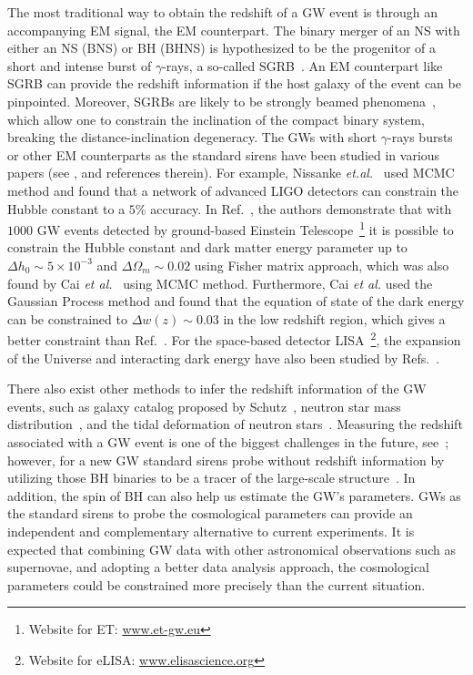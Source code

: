 \documentclass[a4paper,11pt]{article}
\begin{document}
The most traditional way to obtain the redshift of a  GW event is through an accompanying EM signal, the EM counterpart. The binary merger of an NS with either an NS (BNS) or BH (BHNS) is hypothesized to be the progenitor of a short and intense burst of $\gamma$-rays, a so-called SGRB~\cite{Nakar:2007yr}. An EM counterpart like SGRB can provide the redshift information if the host galaxy of the event can be pinpointed. Moreover, SGRBs are likely to be strongly beamed phenomena~\cite{Nakar:2005bs}, which allow one to constrain the inclination of the compact binary system, breaking the distance-inclination degeneracy. The GWs with short $\gamma$-rays bursts or other EM counterparts as the standard sirens have been studied in various  papers (see \cite{Markovic:1993cr,Holz:2005df,Kocsis:2005vv,Dalal:2006qt,MacLeod:2007jd,Linder:2007ge,
Stavridis:2009ys,Cutler:2009qv,Arun:2008xf,Sathyaprakash:2009xt,Nissanke:2009kt,Zhao:2010sz,
DelPozzo:2011yh,Petiteau:2011we,Taylor:2012db,Arabsalmani:2013bj,Tamanini:2016zlh,Yu:2016tar,
Caprini:2016qxs,Cai:2016sby}, and references therein). For example, Nissanke \textit{et.al.}~\cite{Nissanke:2009kt} used MCMC method and found that a network of advanced LIGO detectors can constrain the Hubble constant to a $5\%$ accuracy. In Ref.~\cite{Zhao:2010sz}, the authors demonstrate that with $1000$ GW events detected by ground-based Einstein Telescope~\footnote{Website for ET: \href{www.et-gw.eu}{www.et-gw.eu}} it is possible to constrain the Hubble constant and dark matter energy parameter up to  $\Delta h_0\sim 5\times 10^{-3}$ and $\Delta \Omega_m\sim 0.02$ using Fisher matrix approach, which was also found by Cai {\it et al.}~\cite{Cai:2016sby} using MCMC method. Furthermore, Cai {\it et al.} used the Gaussian Process method and found that the equation of state of the dark energy can be constrained to $\Delta w(z) \sim 0.03$ in the low redshift region, which gives  a better constraint than Ref.~\cite{Zhao:2010sz}. For the space-based detector LISA~\footnote{Website for eLISA: \href{www.elisascience.org}{www.elisascience.org}}, the expansion of the Universe and interacting dark energy have also been studied by Refs.~\cite{Tamanini:2016zlh,Caprini:2016qxs}.

There also exist other methods to infer the redshift information of the GW events, such as galaxy catalog proposed by Schutz~\cite{Schutz:1986gp}, neutron star mass distribution~\cite{Markovic:1993cr,Taylor:2011fs}, and the tidal deformation of neutron stars~\cite{Messenger:2011gi,DelPozzo:2015bna}. Measuring the redshift associated with a GW event is one of the biggest challenges in the future, see~\cite{Namikawa:2015prh}; however, for a new GW standard sirens probe without redshift information by utilizing those BH binaries to be a tracer of the large-scale structure~\cite{Namikawa:2016edr}. In addition, the spin of BH can also help us estimate the GW's parameters. GWs as the standard sirens to probe the cosmological parameters can provide an independent and complementary alternative to current experiments. It is expected that combining GW data with other astronomical observations such as supernovae, and adopting a better data analysis approach, the cosmological parameters could be constrained more precisely than the current situation.
\end{document}
